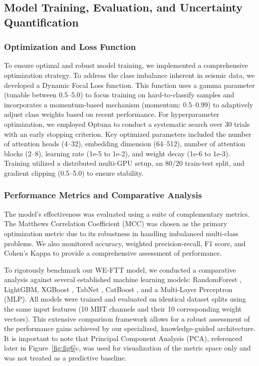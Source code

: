 \documentclass[preprint,review,12pt,authoryear]{elsarticle}
\begin{document}
\subsection{Model Training, Evaluation, and Uncertainty Quantification}\label{sec:model_evaluation}

\subsubsection{Optimization and Loss Function}\label{sec:optimization}
To ensure optimal and robust model training, we implemented a comprehensive optimization strategy. To address the class imbalance inherent in seismic data, we developed a Dynamic Focal Loss function. This function uses a gamma parameter (tunable between 0.5--5.0) to focus training on hard-to-classify samples and incorporates a momentum-based mechanism (momentum: 0.5--0.99) to adaptively adjust class weights based on recent performance. For hyperparameter optimization, we employed Optuna \citep{akibaOptunaNextgenerationHyperparameter2019} to conduct a systematic search over 30 trials with an early stopping criterion. Key optimized parameters included the number of attention heads (4--32), embedding dimension (64--512), number of attention blocks (2--8), learning rate (1e-5 to 1e-2), and weight decay (1e-6 to 1e-3). Training utilized a distributed multi-GPU setup, an 80/20 train-test split, and gradient clipping (0.5--5.0) to ensure stability.

\subsubsection{Performance Metrics and Comparative Analysis}\label{sec:metrics_comparison}

The model's effectiveness was evaluated using a suite of complementary metrics. The Matthews Correlation Coefficient (MCC) \citep{matthewsComparisonPredictedObserved1975} was chosen as the primary optimization metric due to its robustness in handling imbalanced multi-class problems. We also monitored accuracy, weighted precision-recall, F1 score, and Cohen's Kappa \citep{cohenCoefficientAgreementNominal1960} to provide a comprehensive assessment of performance.



To rigorously benchmark our WE-FTT model, we conducted a comparative analysis against several established machine learning models: RandomForest \citep{breiman2001random}, LightGBM, XGBoost \citep{chen2016xgboost}, TabNet \citep{arikTabNetAttentiveInterpretable2021}, CatBoost \citep{prokhorenkovaCatBoostUnbiasedBoosting2018}, and a Multi-Layer Perceptron (MLP). All models were trained and evaluated on identical dataset splits using the same input features (10 MBT channels and their 10 corresponding weight vectors). This extensive comparison framework allows for a robust assessment of the performance gains achieved by our specialized, knowledge-guided architecture. It is important to note that Principal Component Analysis (PCA), referenced later in Figure~\ref{fig:fig6}c, was used for visualization of the metric space only and was not treated as a predictive baseline.
\end{document}
